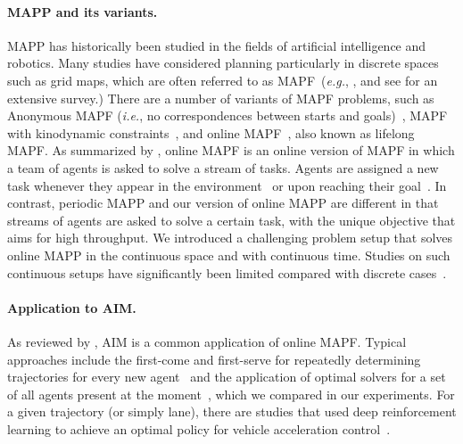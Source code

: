 \documentclass[letterpaper]{article} %
\def\eg{{\it e.g.}}
\def\ie{{\it i.e.}}
\begin{document}
\paragraph{MAPP and its variants.}
MAPP has historically been studied in the fields of artificial intelligence and robotics. Many studies have considered planning particularly in discrete spaces such as grid maps, which are often referred to as MAPF~(\eg, \citet{silver2005cooperative,sharon2015conflict}, and see \citet{stern2019multi} for an extensive survey.) There are a number of variants of MAPF problems, such as Anonymous MAPF (\ie, no correspondences between starts and goals)~\cite{Kloder2006,Yu2013}, MAPF with kinodynamic constraints~\cite{honig2018trajectory,ijcai2018-74}, and online MAPF~\cite{vsvancara2019online,ma2017lifelong,Li2021}, also known as lifelong MAPF. As summarized by \citet{Ma2021}, online MAPF is an online version of MAPF in which a team of agents is asked to solve a stream of tasks. Agents are assigned a new task whenever they appear in the environment~\cite{vsvancara2019online} or upon reaching their goal~\cite{ma2017lifelong}. In contrast, periodic MAPP and our version of online MAPP are different in that streams of agents are asked to solve a certain task, with the unique objective that aims for high throughput. We introduced a challenging problem setup that solves online MAPP in the continuous space and with continuous time. Studies on such continuous setups have significantly been limited compared with discrete cases~\cite{walker2018extended,honig2018trajectory,andreychuk2021improving,andreychuk2022multi,kasaura2022prioritized,okumura2022ctrms}.




\paragraph{Application to AIM.} As reviewed by \citet{stern2019multi,Ma2021}, AIM is a common application of online MAPF. Typical approaches include the first-come and first-serve for repeatedly determining trajectories for every new agent~\cite{dresner2008multiagent} and the application of optimal solvers for a set of all agents present at the moment~\cite{vsvancara2019online}, which we compared in our experiments. For a given trajectory (or simply lane), there are studies that used deep reinforcement learning to achieve an optimal policy for vehicle acceleration control~\cite{Kreidieh2018,Jang2019,Cui2021}.
\end{document}
